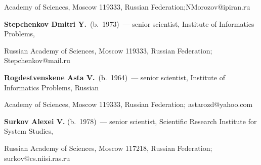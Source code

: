 Academy of Sciences, Moscow 119333, Russian Federation;\linebreak NMorozov@ipiran.ru





\vspace*{3pt}



\noindent

\textbf{Stepchenkov Dmitri Y.}\ (b.\ 1973)~--- senior scientist, Institute of Informatics Problems,

Russian Academy of Sciences, Moscow 119333, Russian Federation; Stepchenkov@mail.ru



\vspace*{3pt}



\noindent

\textbf{Rogdestvenskene Asta V.}\ (b.\ 1964)~--- senior scientist, Institute of Informatics Problems, Russian

Academy of Sciences, Moscow 119333, Russian Federation; astarozd@yahoo.com



\vspace*{3pt}



\noindent

\textbf{Surkov Alexei V.} (b.\ 1978)~--- senior scientist, Scientific Research Institute for System Studies,

Russian Academy of Sciences, Moscow 117218, Russian Federation; surkov@cs.niisi.ras.ru



\label{step2-end}



 \label{end\stat}



\renewcommand{\bibname}{\protect\rm Литература}
